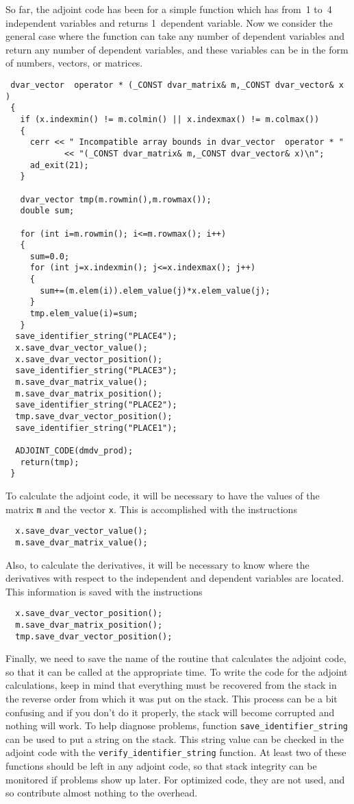 So far, the adjoint code has been for a simple function which has from~1 to~4
independent variables and returns 1~dependent variable. 
Now we consider the general case where the function can take
any number of dependent variables and return any number of 
dependent variables, and these variables can be in the form of numbers, 
vectors, or matrices.
\begin{lstlisting}
 dvar_vector  operator * (_CONST dvar_matrix& m,_CONST dvar_vector& x )
 {
   if (x.indexmin() != m.colmin() || x.indexmax() != m.colmax())
   {
     cerr << " Incompatible array bounds in dvar_vector  operator * "
            << "(_CONST dvar_matrix& m,_CONST dvar_vector& x)\n";
     ad_exit(21);
   }

   dvar_vector tmp(m.rowmin(),m.rowmax());
   double sum;

   for (int i=m.rowmin(); i<=m.rowmax(); i++)
   {
     sum=0.0;
     for (int j=x.indexmin(); j<=x.indexmax(); j++)
     {
       sum+=(m.elem(i)).elem_value(j)*x.elem_value(j);
     }
     tmp.elem_value(i)=sum;
   }
  save_identifier_string("PLACE4");
  x.save_dvar_vector_value();
  x.save_dvar_vector_position();
  save_identifier_string("PLACE3");
  m.save_dvar_matrix_value();
  m.save_dvar_matrix_position();
  save_identifier_string("PLACE2");
  tmp.save_dvar_vector_position();
  save_identifier_string("PLACE1");
  
  ADJOINT_CODE(dmdv_prod);
   return(tmp);
 }
\end{lstlisting}
To calculate the adjoint code, it will be necessary to have the
values of the matrix \texttt{m} and the vector \texttt{x}.
This is accomplished with the instructions
\begin{lstlisting}
  x.save_dvar_vector_value();
  m.save_dvar_matrix_value();
\end{lstlisting}
Also, to calculate the derivatives, it will be necessary to know where the
derivatives with respect to the independent and dependent variables are 
located. This information is saved with the instructions
\begin{lstlisting}
  x.save_dvar_vector_position();
  m.save_dvar_matrix_position();
  tmp.save_dvar_vector_position();
\end{lstlisting}
Finally, we need to save the name of the routine that calculates
the adjoint code, so that it can be called at the appropriate time. To write the
code for the adjoint calculations, keep in mind that everything must be recovered
from the stack in the reverse order from which it was put on the stack.
This process can be a bit confusing and if you don't do it properly, the 
stack will become corrupted and nothing will work.  To help diagnose
problems, function \texttt{save\_identifier\_string} can be
used to put a string on the stack. This string value can be checked in the
adjoint code with the \texttt{verify\_identifier\_string} function. At least two of
these functions should be left in any adjoint code, so that stack
integrity can be monitored if problems show up later. For optimized code,
they are not used, and so contribute almost nothing to the overhead.


